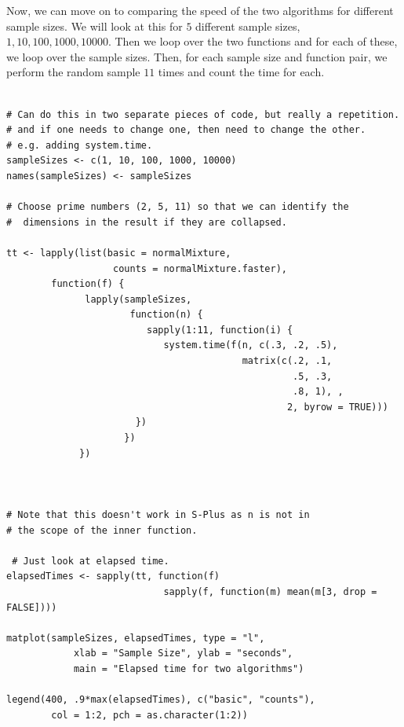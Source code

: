 Now, we can move on to comparing the speed of the two algorithms for
different sample sizes.  We will look at this for $5$ different sample
sizes, $1, 10, 100, 1000, 10000$.  Then we loop over the two functions
and for each of these, we loop over the sample sizes.
Then, for each sample size and function pair, we perform the
random sample $11$ times and count the time for each.
{\footnotesize{
\begin{verbatim}

# Can do this in two separate pieces of code, but really a repetition.
# and if one needs to change one, then need to change the other.
# e.g. adding system.time.
sampleSizes <- c(1, 10, 100, 1000, 10000)
names(sampleSizes) <- sampleSizes

# Choose prime numbers (2, 5, 11) so that we can identify the
#  dimensions in the result if they are collapsed.

tt <- lapply(list(basic = normalMixture,
                   counts = normalMixture.faster),
        function(f) {
              lapply(sampleSizes,
                      function(n) {
                         sapply(1:11, function(i) {
                            system.time(f(n, c(.3, .2, .5), 
                                          matrix(c(.2, .1, 
                                                   .5, .3, 
                                                   .8, 1), ,
                                                  2, byrow = TRUE)))
                       })
                     })
             })



# Note that this doesn't work in S-Plus as n is not in 
# the scope of the inner function.

 # Just look at elapsed time.
elapsedTimes <- sapply(tt, function(f)  
                            sapply(f, function(m) mean(m[3, drop = FALSE])))

matplot(sampleSizes, elapsedTimes, type = "l",
            xlab = "Sample Size", ylab = "seconds", 
            main = "Elapsed time for two algorithms")

legend(400, .9*max(elapsedTimes), c("basic", "counts"), 
        col = 1:2, pch = as.character(1:2))
\end{verbatim}
}}

